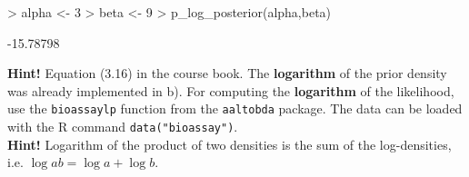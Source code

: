 \documentclass[11pt,a4paper,english]{article}
\begin{document}
\begin{enumerate}
\begin{itemize}
  
\begin{Schunk}
\begin{Sinput}
> alpha <- 3
> beta <- 9
> p_log_posterior(alpha,beta)
\end{Sinput}
\begin{Soutput}
[1] -15.78798
\end{Soutput}
\end{Schunk}
\textbf{Hint!} Equation (3.16) in the course book. The \textbf{logarithm} of the prior density was already implemented in b). For computing the \textbf{logarithm} of the likelihood, use the {\tt bioassaylp} function from the {\tt aaltobda} package. The data can be loaded with the R command {\tt data("bioassay")}.\\
\textbf{Hint!} Logarithm of the product of two densities is the sum of the log-densities, i.e. $\log ab = \log a + \log b$.


\end{itemize}
\end{enumerate}
\end{document}

